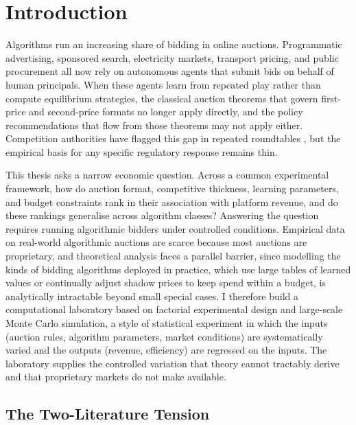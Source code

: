 \chapter{Introduction}
\label{ch:introduction}

Algorithms run an increasing share of bidding in online auctions. Programmatic advertising, sponsored search, electricity markets, transport pricing, and public procurement all now rely on autonomous agents that submit bids on behalf of human principals. When these agents learn from repeated play rather than compute equilibrium strategies, the classical auction theorems that govern first-price and second-price formats no longer apply directly, and the policy recommendations that flow from those theorems may not apply either. Competition authorities have flagged this gap in repeated roundtables \citep{OECD2017, EzrachiStucke2017, OECD2023}, but the empirical basis for any specific regulatory response remains thin.

This thesis asks a narrow economic question. Across a common experimental framework, how do auction format, competitive thickness, learning parameters, and budget constraints rank in their association with platform revenue, and do these rankings generalise across algorithm classes? Answering the question requires running algorithmic bidders under controlled conditions. Empirical data on real-world algorithmic auctions are scarce because most auctions are proprietary, and theoretical analysis faces a parallel barrier, since modelling the kinds of bidding algorithms deployed in practice, which use large tables of learned values or continually adjust shadow prices to keep spend within a budget, is analytically intractable beyond small special cases. I therefore build a computational laboratory based on factorial experimental design and large-scale Monte Carlo simulation, a style of statistical experiment in which the inputs (auction rules, algorithm parameters, market conditions) are systematically varied and the outputs (revenue, efficiency) are regressed on the inputs. The laboratory supplies the controlled variation that theory cannot tractably derive and that proprietary markets do not make available.

\section{The Two-Literature Tension}
\label{sec:intro_tension}

